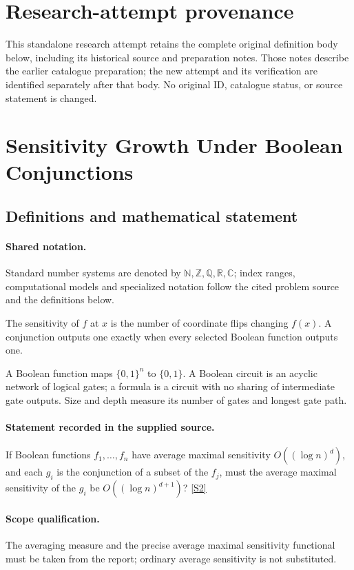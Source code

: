 \documentclass[11pt]{article}
\begin{document}
\section*{Research-attempt provenance}
This standalone research attempt retains the complete original definition body below,
including its historical source and preparation notes. Those notes describe the
earlier catalogue preparation; the new attempt and its verification are identified
separately after that body. No original ID, catalogue status, or source statement is changed.

\section{Sensitivity Growth Under Boolean Conjunctions}\label{statement}

\subsection{Definitions and mathematical statement}

\paragraph{Shared notation.}Standard number systems are denoted by $\mathbb N,\mathbb Z,\mathbb Q,\mathbb R,\mathbb C$; index ranges, computational models and specialized notation follow the cited problem source and the definitions below.


The sensitivity of $f$ at $x$ is the number of coordinate flips changing $f(x)$. A conjunction outputs one exactly when every selected Boolean function outputs one.

A Boolean function maps $\{0,1\}^n$ to $\{0,1\}$. A Boolean circuit is an acyclic network of logical gates; a formula is a circuit with no sharing of intermediate gate outputs. Size and depth measure its number of gates and longest gate path.
\paragraph{Statement recorded in the supplied source.}
If Boolean functions $f_1,\ldots,f_n$ have average maximal sensitivity $O((\log n)^d)$, and each $g_i$ is the conjunction of a subset of the $f_j$, must the average maximal sensitivity of the $g_i$ be $O((\log n)^{d+1})$? \href{https://doi.org/10.4171/owr/2009/52}{[S2]}
\paragraph{Scope qualification.}
The averaging measure and the precise average maximal sensitivity functional must be taken from the report; ordinary average sensitivity is not substituted.
\end{document}
